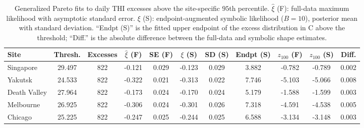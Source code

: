 \begin{table}[t]
\centering
\scriptsize
\renewcommand{\tabcolsep}{3pt}
\caption{Generalized Pareto fits to daily THI excesses above the site-specific $95$th percentile. $\hat\xi$ (F): full-data maximum likelihood with asymptotic standard error. $\xi$ (S): endpoint-augmented symbolic likelihood ($B=10$), posterior mean with standard deviation. ``Endpt (S)'' is the fitted upper endpoint of the excess distribution in \textdegree C above the threshold; ``Diff.'' is the absolute difference between the full-data and symbolic shape estimates.}
\label{tab:app-pot}
\begin{adjustbox}{max width=\textwidth}
\begin{tabular}{l *{10}{c}}
\toprule
Site & Thresh. & Excesses & $\hat\xi$ (F) & SE (F) & $\xi$ (S) & SD (S) & Endpt (S) & $z_{100}$ (F) & $z_{100}$ (S) & Diff. \\
\midrule
Singapore & 29.497 & 822 & -0.121 & 0.029 & -0.123 & 0.029 & 3.882 & -0.782 & -0.789 & 0.002 \\
Yakutsk & 24.533 & 822 & -0.322 & 0.021 & -0.313 & 0.022 & 7.746 & -5.103 & -5.066 & 0.008 \\
Death Valley & 27.964 & 822 & -0.173 & 0.024 & -0.170 & 0.024 & 5.179 & -1.588 & -1.599 & 0.003 \\
Melbourne & 26.925 & 822 & -0.306 & 0.024 & -0.301 & 0.026 & 7.318 & -4.591 & -4.538 & 0.005 \\
Chicago & 25.225 & 822 & -0.247 & 0.025 & -0.244 & 0.025 & 6.588 & -3.134 & -3.148 & 0.003 \\
\bottomrule
\end{tabular}
\end{adjustbox}
\end{table}